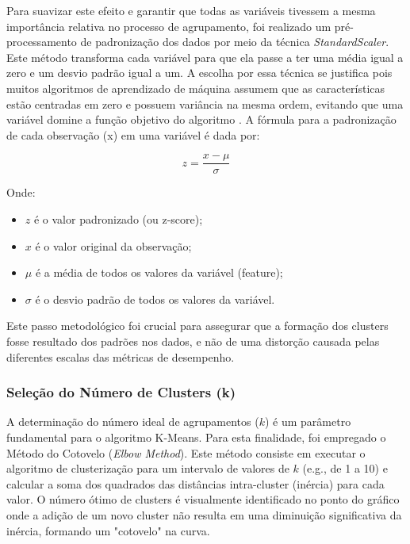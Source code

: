Para suavizar este efeito e garantir que todas as variáveis tivessem a mesma importância relativa no processo de agrupamento, foi realizado um pré-processamento de padronização dos dados por meio da técnica \textit{StandardScaler}. Este método transforma cada variável para que ela passe a ter uma média igual a zero e um desvio padrão igual a um. A escolha por essa técnica se justifica pois muitos algoritmos de aprendizado de máquina assumem que as características estão centradas em zero e possuem variância na mesma ordem, evitando que uma variável domine a função objetivo do algoritmo \citep{scikitlearn_preprocessing}. A fórmula para a padronização de cada observação (x) em uma variável é dada por:

\begin{equation}
    z = \frac{x - \mu}{\sigma}
    \label{eq:standardscaler}
\end{equation}

Onde:
\begin{itemize}
    \item $z$ é o valor padronizado (ou z-score);
    \item $x$ é o valor original da observação;
    \item $\mu$ é a média de todos os valores da variável (feature);
    \item $\sigma$ é o desvio padrão de todos os valores da variável.
\end{itemize}

Este passo metodológico foi crucial para assegurar que a formação dos clusters fosse resultado dos padrões nos dados, e não de uma distorção causada pelas diferentes escalas das métricas de desempenho.

\subsubsection{Seleção do Número de Clusters (k)}

A determinação do número ideal de agrupamentos ($k$) é um parâmetro fundamental para o algoritmo K-Means. Para esta finalidade, foi empregado o Método do Cotovelo (\textit{Elbow Method})\citep{thorndike1953}. Este método consiste em executar o algoritmo de clusterização para um intervalo de valores de $k$ (e.g., de 1 a 10) e calcular a soma dos quadrados das distâncias intra-cluster (inércia) para cada valor. O número ótimo de clusters é visualmente identificado no ponto do gráfico onde a adição de um novo cluster não resulta em uma diminuição significativa da inércia, formando um "cotovelo" na curva.


